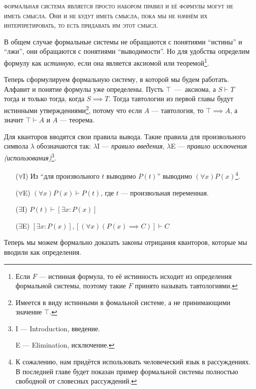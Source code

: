 \textsc{формальная система является просто набором правил и её формулы
	могут не иметь смысла. Они и не будут иметь смысла, пока мы не начнём их
	интерпретировать, то есть придавать им этот смысл.}

В общем случае формальные системы не обращаются с понятиями ``истины'' и ``лжи'',
они обращаются с понятиями ``выводимости''. Но для удобства определим формулу
как {\it истинную}, если она является аксиомой или теоремой\footnote{
	Если $F$ --- истинная формула, то её истинность исходит из
	определения формальной системы, поэтому такие $F$ принято называть тавтологиями.
}.

Теперь сформулируем формальную систему, в которой мы будем работать.
Алфавит и понятие формулы уже определены. Пусть $\top$~---~аксиома,
а $S\vdash T$ тогда и только тогда, когда ${S\implies T}$.
Тогда тавтологии из первой главы будут истинными
утверждениями\footnote{Имеется в виду истинными в фомальной системе,
	а не принимающими значение $\top$.}, потому что если $A$ --- тавтология,
то ${\top\implies A}$, а значит $\top\vdash A$ и $A$ --- теорема.

\pagebreak

Для кванторов вводятся свои правила вывода. Такие правила для произвольного
символа $\lambda$ обозначаются так: $\lambda$I --- {\it правило
введения}, $\lambda$E --- {\it правило исключения (использования)}\footnote{
	I --- Introduction, введение.

	E --- Elimination, исключение.
}.

\newcommand\Aii{$\forall$I}
\newcommand\Aee{$\forall$E}
\newcommand\Eii{$\exists$I}
\newcommand\Eee{$\exists$E}
\begin{enumerate}
	\item[(\Aii)]{}Из ``для произвольного $t$ выводимо $P(t)$''
	выводимо $(\forall x)P(x)$\footnote{К сожалению, нам придётся использовать
		человеческий язык в рассуждениях. В последней главе будет показан пример формальной
		системы полностью свободной от словесных рассуждений.}.
	\item[(\Aee)]{}$(\forall x)P(x)\vdash P(t)$, где $t$ --- произвольная переменная.
	\item[(\Eii)]{}$P(t)\vdash [\exists x:P(x)]$
	\item[(\Eee)]{}$[\exists x:P(x)], [(\forall x)(P(x)\implies C)]\vdash C$
\end{enumerate}

Теперь мы можем формально доказать законы отрицания кванторов,
которые мы вводили как определения.

